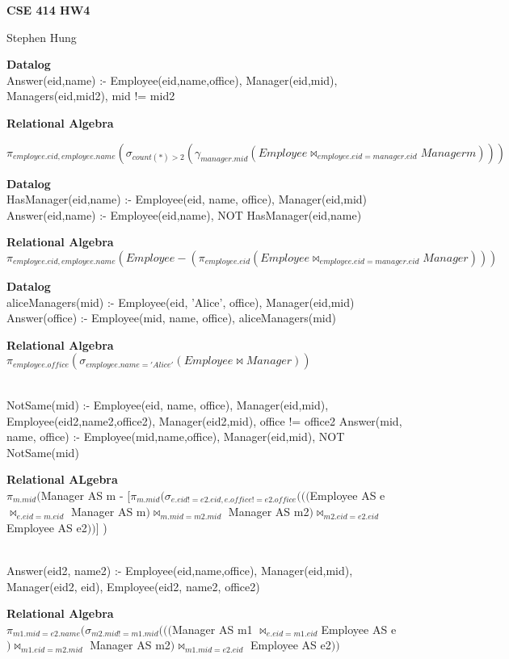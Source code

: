\documentclass[12pt]{exam}
\begin{document}
\centerline{\textbf{CSE 414 HW4}}
\centerline{Stephen Hung}


\begin{questions}

\question 

{\bf Datalog}\\
Answer(eid,name) :- Employee(eid,name,office), Manager(eid,mid), Managers(eid,mid2), mid != mid2

{\bf Relational Algebra}

$\pi_{employee.eid,employee.name}(\sigma_{count(*)>2}(\gamma_{manager.mid}(Employee \Join_{employee.eid = manager.eid} Manager m)))$

\question

{\bf Datalog}\\
HasManager(eid,name) :- Employee(eid, name, office), Manager(eid,mid)
Answer(eid,name) :- Employee(eid,name), NOT HasManager(eid,name)

{\bf Relational Algebra}\\
$\pi_{employee.eid, employee.name}(Employee - (\pi_{employee.eid} (Employee \Join_{employee.eid = manager.eid} Manager)))$


\question 

{\bf Datalog}\\
aliceManagers(mid) :- Employee(eid, 'Alice', office), Manager(eid,mid)
Answer(office) :- Employee(mid, name, office), aliceManagers(mid)

{\bf Relational Algebra}\\
$\pi_{employee.office} (\sigma_{employee.name = 'Alice'}(Employee\Join Manager))$

\\
NotSame(mid) :- Employee(eid, name, office), Manager(eid,mid), Employee(eid2,name2,office2), Manager(eid2,mid), office != office2
Answer(mid, name, office) :- Employee(mid,name,office), Manager(eid,mid), NOT NotSame(mid) 

{\bf Relational ALgebra}\\
 $\pi_{m.mid}($Manager AS m - [$\pi_{m.mid}( \sigma_{e.eid != e2.eid, e.office ! = e2.office}((( $Employee AS e $\Join_{e.eid = m.eid}$ Manager AS m$) \Join_{m.mid = m2.mid}$ Manager AS m2$)\Join_{m2.eid = e2.eid} $Employee AS e2$ ))$] )


\\
Answer(eid2, name2) :- Employee(eid,name,office), Manager(eid,mid), Manager(eid2, eid), Employee(eid2, name2, office2)


{\bf Relational Algebra}\\
$\pi_{m1.mid = e2.name}(\sigma_{m2.mid != m1.mid}((($Manager AS m1 $\Join_{e.eid = m1.eid} $Employee AS e$)\Join_{m1.eid = m2.mid}$ Manager AS m2$)\Join_{m1.mid = e2.eid}$ Employee AS e2$))
$


\end{questions}
\end{document}
